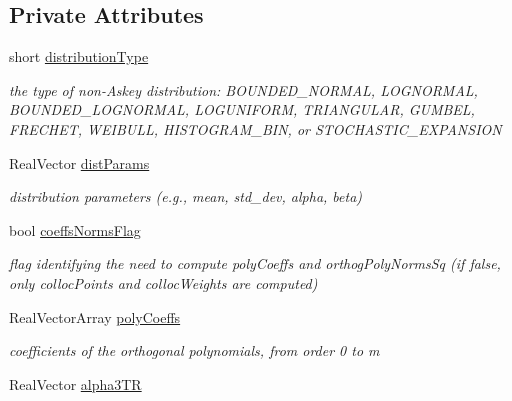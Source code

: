 \subsection*{Private Attributes}
\begin{DoxyCompactItemize}
\item 
short \hyperlink{classPecos_1_1NumericGenOrthogPolynomial_a885e61a742d9580b5d4df39f997cb706}{distribution\+Type}\label{classPecos_1_1NumericGenOrthogPolynomial_a885e61a742d9580b5d4df39f997cb706}

\begin{DoxyCompactList}\small\item\em the type of non-\/\+Askey distribution\+: B\+O\+U\+N\+D\+E\+D\+\_\+\+N\+O\+R\+M\+AL, L\+O\+G\+N\+O\+R\+M\+AL, B\+O\+U\+N\+D\+E\+D\+\_\+\+L\+O\+G\+N\+O\+R\+M\+AL, L\+O\+G\+U\+N\+I\+F\+O\+RM, T\+R\+I\+A\+N\+G\+U\+L\+AR, G\+U\+M\+B\+EL, F\+R\+E\+C\+H\+ET, W\+E\+I\+B\+U\+LL, H\+I\+S\+T\+O\+G\+R\+A\+M\+\_\+\+B\+IN, or S\+T\+O\+C\+H\+A\+S\+T\+I\+C\+\_\+\+E\+X\+P\+A\+N\+S\+I\+ON \end{DoxyCompactList}\item 
Real\+Vector \hyperlink{classPecos_1_1NumericGenOrthogPolynomial_a0e7787261b90d3559dfd8ac5aaaf2ba5}{dist\+Params}\label{classPecos_1_1NumericGenOrthogPolynomial_a0e7787261b90d3559dfd8ac5aaaf2ba5}

\begin{DoxyCompactList}\small\item\em distribution parameters (e.\+g., mean, std\+\_\+dev, alpha, beta) \end{DoxyCompactList}\item 
bool \hyperlink{classPecos_1_1NumericGenOrthogPolynomial_a216f184d63de7370a1a674f4b1b7728d}{coeffs\+Norms\+Flag}\label{classPecos_1_1NumericGenOrthogPolynomial_a216f184d63de7370a1a674f4b1b7728d}

\begin{DoxyCompactList}\small\item\em flag identifying the need to compute poly\+Coeffs and orthog\+Poly\+Norms\+Sq (if false, only colloc\+Points and colloc\+Weights are computed) \end{DoxyCompactList}\item 
Real\+Vector\+Array \hyperlink{classPecos_1_1NumericGenOrthogPolynomial_a05e14bc7c5a8f0567369ebd6c8eeb7b8}{poly\+Coeffs}\label{classPecos_1_1NumericGenOrthogPolynomial_a05e14bc7c5a8f0567369ebd6c8eeb7b8}

\begin{DoxyCompactList}\small\item\em coefficients of the orthogonal polynomials, from order 0 to m \end{DoxyCompactList}\item 
Real\+Vector \hyperlink{classPecos_1_1NumericGenOrthogPolynomial_af34122cfd7e48b5a261086156fce8ee7}{alpha3\+TR}\label{classPecos_1_1NumericGenOrthogPolynomial_af34122cfd7e48b5a261086156fce8ee7}


\end{DoxyCompactItemize}
